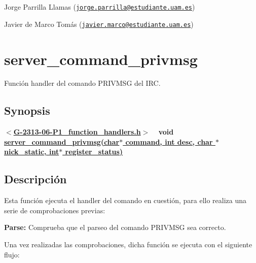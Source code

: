 \begin{DoxyItemize}
\item Jorge Parrilla Llamas (\href{mailto:jorge.parrilla@estudiante.uam.es}{\tt jorge.\+parrilla@estudiante.\+uam.\+es}) 
\item Javier de Marco Tomás (\href{mailto:javier.marco@estudiante.uam.es}{\tt javier.\+marco@estudiante.\+uam.\+es}) 
\end{DoxyItemize}\hypertarget{server_command_privmsg}{}\section{server\+\_\+command\+\_\+privmsg}\label{server_command_privmsg}
Función handler del comando P\+R\+I\+V\+M\+SG del I\+RC.\hypertarget{server_command_privmsg_synopsis_privmsg}{}\subsection{Synopsis}\label{server_command_privmsg_synopsis_privmsg}
{ {\bfseries $<$\hyperlink{G-2313-06-P1__function__handlers_8h}{G-\/2313-\/06-\/\+P1\+\_\+function\+\_\+handlers.\+h}$>$} ~\newline
 {\bfseries void \hyperlink{G-2313-06-P1__function__handlers_8c_a8daf68135f2d9e9412c04a2980bdfb2f}{server\+\_\+command\+\_\+privmsg(char$\ast$ command, int desc, char $\ast$ nick\+\_\+static, int$\ast$ register\+\_\+status)}} } \hypertarget{server_command_privmsg_descripcion_privmsg}{}\subsection{Descripción}\label{server_command_privmsg_descripcion_privmsg}
Esta función ejecuta el handler del comando en cuestión, para ello realiza una serie de comprobaciones previas\+:


\begin{DoxyItemize}
\item {\bfseries Parse\+:} Comprueba que el parseo del comando P\+R\+I\+V\+M\+SG sea correcto. 
\end{DoxyItemize}

Una vez realizadas las comprobaciones, dicha función se ejecuta con el siguiente flujo\+:


